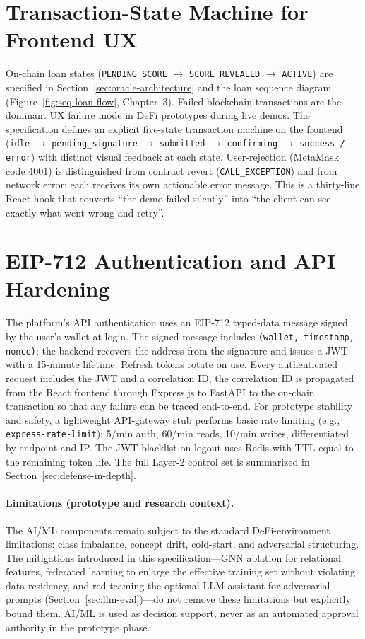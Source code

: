 \documentclass[12pt,a4paper]{report}
\begin{document}
\section{Transaction-State Machine for Frontend UX}
\label{sec:tx-state-machine}

On-chain loan states (\texttt{PENDING\_SCORE} $\to$ \texttt{SCORE\_REVEALED} $\to$ \texttt{ACTIVE}) are specified in Section~\ref{sec:oracle-architecture} and the loan sequence diagram (Figure~\ref{fig:seq-loan-flow}, Chapter~3). Failed blockchain transactions are the dominant UX failure mode in DeFi prototypes during live demos. The specification defines an explicit five-state transaction machine on the frontend (\texttt{idle} $\to$ \texttt{pending\_signature} $\to$ \texttt{submitted} $\to$ \texttt{confirming} $\to$ \texttt{success / error}) with distinct visual feedback at each state. User-rejection (MetaMask code 4001) is distinguished from contract revert (\texttt{CALL\_EXCEPTION}) and from network error; each receives its own actionable error message. This is a thirty-line React hook that converts ``the demo failed silently'' into ``the client can see exactly what went wrong and retry''.

\section{EIP-712 Authentication and API Hardening}
\label{sec:eip712-auth}

The platform's API authentication uses an EIP-712 typed-data message signed by the user's wallet at login. The signed message includes \texttt{(wallet, timestamp, nonce)}; the backend recovers the address from the signature and issues a JWT with a 15-minute lifetime. Refresh tokens rotate on use. Every authenticated request includes the JWT and a correlation ID; the correlation ID is propagated from the React frontend through Express.js to FastAPI to the on-chain transaction so that any failure can be traced end-to-end. For prototype stability and safety, a lightweight API-gateway stub performs basic rate limiting (e.g., \texttt{express-rate-limit}): 5/min auth, 60/min reads, 10/min writes, differentiated by endpoint and IP. The JWT blacklist on logout uses Redis with TTL equal to the remaining token life. The full Layer-2 control set is summarized in Section~\ref{sec:defense-in-depth}.

\paragraph{Limitations (prototype and research context).}
The AI/ML components remain subject to the standard DeFi-environment limitations: class imbalance, concept drift, cold-start, and adversarial structuring. The mitigations introduced in this specification---GNN ablation for relational features, federated learning to enlarge the effective training set without violating data residency, and red-teaming the optional LLM assistant for adversarial prompts (Section~\ref{sec:llm-eval})---do not remove these limitations but explicitly bound them. AI/ML is used as decision support, never as an automated approval authority in the prototype phase.
\end{document}
